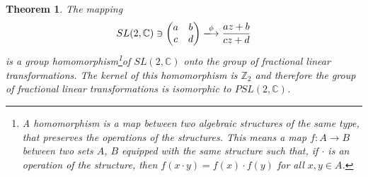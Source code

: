\documentclass[11pt]{book}
\newtheorem{theorem}{Theorem}[chapter]
\theoremstyle{definition}
\numberwithin{equation}{chapter}
\begin{document}
\medskip

\begin{theorem}
The mapping
\begin{align*}
    SL(2, \mathbb{C}) \ni \begin{pmatrix}
        a & b \\
        c & d
    \end{pmatrix} \xlongrightarrow[]{\phi} \frac{az + b}{cz + d}
\end{align*}
is a group homomorphism\footnote{A {\it homomorphism} is a map between two algebraic structures of the same type, that preserves the operations of the structures. This means a map $f:A \to B$ between two sets $A$, $B$ equipped with the same structure such that, if $\cdot$ is an operation of the structure, then $f(x \cdot y) = f(x) \cdot f(y)$ for all $x,y \in A$\cite{42}.}of $SL(2, \mathbb{C})$ onto the group of fractional linear transformations. The kernel of this homomorphism is $\mathbb{Z}_2$ and therefore the group of fractional linear transformations is isomorphic to $PSL(2, \mathbb{C})$.
\end{theorem}
\end{document}
